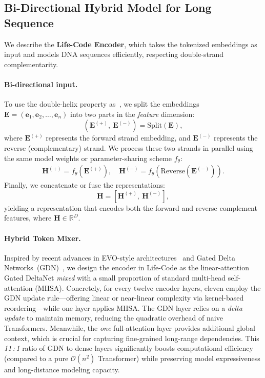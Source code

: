 \subsection{Bi-Directional Hybrid Model for Long Sequence}
\label{sec:hybrid-model}

We describe the \textbf{Life-Code Encoder}, which takes the tokenized embeddings as input and models DNA sequences efficiently, respecting double-strand complementarity.

\vspace{-0.25em}
\paragraph{Bi-directional input.}
To use the double-helix property as~\citet{icml2024caduceus}, we split the embeddings \(\mathbf{E} = (\mathbf{e}_1, \mathbf{e}_2, \ldots, \mathbf{e}_n)\) into two parts in the \textit{feature} dimension:
\[
(\mathbf{E}^{(+)},\ \mathbf{E}^{(-)}) = \mathrm{Split}(\mathbf{E}),
\]
where \(\mathbf{E}^{(+)}\) represents the forward strand embedding, and \(\mathbf{E}^{(-)}\) represents the reverse (complementary) strand. We process these two strands in parallel using the same model weights or parameter-sharing scheme \(f_\theta\):
\begin{align*}
    \mathbf{H}^{(+)} = f_\theta(\mathbf{E}^{(+)}), \quad
    \mathbf{H}^{(-)} = f_\theta(\mathrm{Reverse}(\mathbf{E}^{(-)})).
\end{align*}
Finally, we concatenate or fuse the representations:
\[
\mathbf{H} = [\mathbf{H}^{(+)},\ \mathbf{H}^{(-)}],
\]
yielding a representation that encodes both the forward and reverse complement features, where $\mathbf{H} \in \mathbb{R}^{D}$.

\paragraph{Hybrid Token Mixer.}
Inspired by recent advances in EVO-style architectures~\cite{nguyen2024evo} and Gated Delta Networks~(GDN)~\cite{yang2024gateddelta}, we design the encoder in Life-Code as the linear-attention Gated DeltaNet \emph{mixed} with a small proportion of standard multi-head self-attention (MHSA). Concretely, for every twelve encoder layers, eleven employ the GDN update rule---offering linear or near-linear complexity via kernel-based reordering---while one layer applies MHSA. The GDN layer relies on a \emph{delta update} to maintain memory, reducing the quadratic overhead of naive Transformers. Meanwhile, the \emph{one} full-attention layer provides additional global context, which is crucial for capturing fine-grained long-range dependencies. This \textit{11\,{:}\,1} ratio of GDN to dense layers significantly boosts computational efficiency (compared to a pure \(\mathcal{O}(n^2)\) Transformer) while preserving model expressiveness and long-distance modeling capacity.

